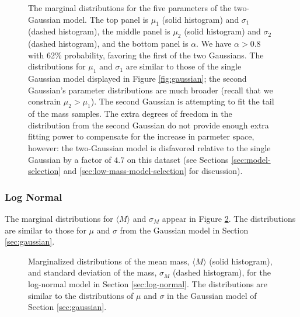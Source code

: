 \documentclass[preprint]{aastex}
\begin{document}
\begin{figure}
  \begin{center}
  \end{center}
  \caption{\label{fig:two-gaussian} The marginal distributions for the
    five parameters of the two-Gaussian model.  The top panel is
    $\mu_1$ (solid histogram) and $\sigma_1$ (dashed histogram), the
    middle panel is $\mu_2$ (solid histogram) and $\sigma_2$ (dashed
    histogram), and the bottom panel is $\alpha$. We have $\alpha >
    0.8$ with 62\% probability, favoring the first of the two
    Gaussians.  The distributions for $\mu_1$ and $\sigma_1$ are
    similar to those of the single Gaussian model displayed in Figure
    \ref{fig:gaussian}; the second Gaussian's parameter distributions
    are much broader (recall that we constrain $\mu_2 > \mu_1$).  The
    second Gaussian is attempting to fit the tail of the mass samples.
    The extra degrees of freedom in the distribution from the second
    Gaussian do not provide enough extra fitting power to compensate
    for the increase in parmeter space, however: the two-Gaussian
    model is disfavored relative to the single Gaussian by a factor of
    $4.7$ on this dataset (see Sections \ref{sec:model-selection} and
    \ref{sec:low-mass-model-selection} for discussion).}
\end{figure}

\subsubsection{Log Normal}

The marginal distributions for $\langle M \rangle$ and $\sigma_M$
appear in Figure \ref{fig:log-normal}.  The distributions are similar
to those for $\mu$ and $\sigma$ from the Gaussian model in Section
\ref{sec:gaussian}.

\begin{figure}
  \begin{center}
  \end{center}
  \caption{\label{fig:log-normal} Marginalized distributions of the
    mean mass, $\langle M \rangle$ (solid histogram), and standard
    deviation of the mass, $\sigma_M$ (dashed histogram), for the
    log-normal model in Section \ref{sec:log-normal}.  The
    distributions are similar to the distributions of $\mu$ and
    $\sigma$ in the Gaussian model of Section \ref{sec:gaussian}.}
\end{figure}
\end{document}
